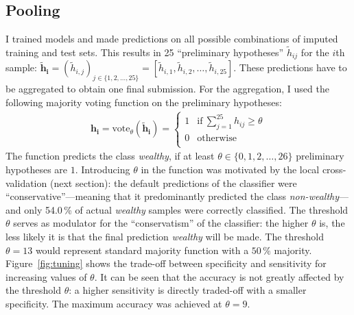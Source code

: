 \documentclass[a4paper,11pt]{article}
\begin{document}
\subsection{Pooling}
\label{sec:pooling}

I trained models and made predictions on all possible combinations of
imputed training and test sets. This results in 25 ``preliminary
hypotheses'' $\tilde{h}_{ij}$ for the $i$th sample:
$\mathbf{\tilde{h}_i} = (\tilde{h}_{i,j})_{j \in \{1, 2, \ldots, 25\}} = [\tilde{h}_{i,1}, \tilde{h}_{i,2}, \ldots, \tilde{h}_{i,25}]$. These
predictions have to be aggregated to obtain one final submission. For
the aggregation, I used the following majority voting function on the
preliminary hypotheses:
\begin{align}
\mathbf{h_i} = \text{vote}_\theta(\mathbf{\tilde{h}_i}) =
\begin{cases}
1 & \text{if}~\sum_{j = 1}^{25} h_{ij} \geq \theta\\
0 & \text{otherwise }\\
\end{cases}
\end{align}
The function predicts the class \emph{wealthy}, if at least
$\theta \in \{0, 1, 2, \ldots, 26\}$ preliminary hypotheses are
$1$. Introducing $\theta$ in the function was motivated by the local
cross-validation (next section): the default predictions of the
classifier were ``conservative''---meaning that it predominantly
predicted the class \emph{non-wealthy}---and only 54.0\,\% of actual
\emph{wealthy} samples were correctly classified. The threshold
$\theta$ serves as modulator for the ``conservatism'' of the
classifier: the higher $\theta$ is, the less likely it is that the
final prediction \emph{wealthy} will be made. The threshold
$\theta = 13$ would represent standard majority function with a
$50\,\%$ majority.  Figure~\ref{fig:tuning} shows the trade-off
between specificity and sensitivity for increasing values of
$\theta$. It can be seen that the accuracy is not greatly affected by
the threshold $\theta$: a higher sensitivity is directly traded-off
with a smaller specificity. The maximum accuracy was achieved at
$\theta = 9$.
\end{document}
